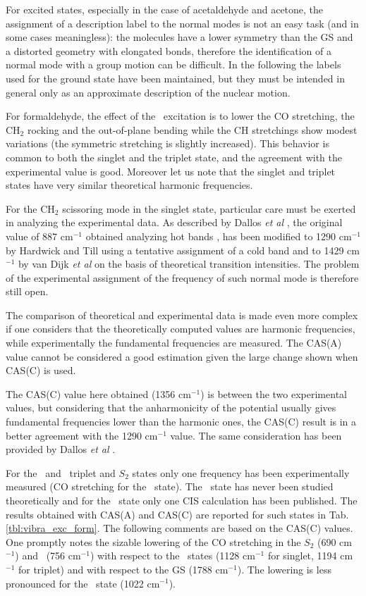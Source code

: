For excited states, especially in the case of acetaldehyde and acetone, the
assignment of a description label to the normal modes is not an easy task
(and in some cases meaningless): the molecules have a lower symmetry than
the GS and a distorted geometry with elongated bonds, therefore the
identification of a normal mode with a group motion can be difficult. 
In the following the labels used for the ground state have been maintained,
but they must be intended in general only as an approximate description of
the nuclear motion.

For formaldehyde, the effect of the \npi\ excitation is to lower the CO
stretching, the CH$_2$ rocking and the out-of-plane bending while the CH
stretchings show modest variations (the symmetric stretching is slightly
increased). This behavior is common to both the singlet and the triplet
state, and the agreement with the experimental value is good. Moreover let us
note that the singlet and triplet states have very similar theoretical
harmonic frequencies.

For the CH$_2$ scissoring mode in the singlet state, particular care must be
exerted in analyzing the experimental data. As described by Dallos {\it et
al} \cite{jcp-114-746-2001}, the original value of 887 cm$^{-1}$ obtained
analyzing hot bands \cite{jms-30-365-1969}, has been modified to 1290
cm$^{-1}$ by Hardwick and Till \cite{jcp-70-2340-1979} using a tentative
assignment of a cold band and to 1429 cm$^{-1}$ by van Dijk {\it et al}
\cite{jcp-69-2453-1979} on the basis of theoretical transition intensities.
The problem of the experimental assignment of the frequency of such normal
mode is therefore still open. 

The comparison of theoretical and experimental data is made even more
complex if one considers that the theoretically computed  values are harmonic
frequencies, while experimentally the fundamental frequencies are measured.
The CAS(A) value cannot be considered a good estimation given the large
change shown when CAS(C) is used.  

The CAS(C) value here obtained (1356 cm$^{-1}$) is between
the two experimental values, but considering that the anharmonicity of the
potential usually gives fundamental frequencies lower than the harmonic
ones, the CAS(C) result is in a better agreement with the 1290 cm$^{-1}$
value.  The same consideration has been provided by Dallos {\it et al}
\cite{jcp-114-746-2001}.

For the \pipi\ and \spi\ triplet and $S_2$ states only one frequency has
been experimentally measured (CO stretching for the \tpipi\ state).  The
\tspi\ state has never been studied theoretically and for the \tpipi\ state
only one CIS \cite{jpc-97-4293-1993} calculation has been published.  The
results obtained with CAS(A) and CAS(C) are reported for such states in Tab.
\ref{tbl:vibra_exc_form}.  The following comments are based on the CAS(C) values.
One promptly notes the sizable lowering of the CO stretching in the $S_2$
(690 cm$^{-1}$) and \tspi\ (756 cm$^{-1}$) with respect to the \npi\ states
(1128 cm$^{-1}$ for singlet, 1194 cm$^{-1}$ for triplet) and with respect to
the GS (1788 cm$^{-1}$).  The lowering is less pronounced for the \tpipi\
state (1022 cm$^{-1}$).


